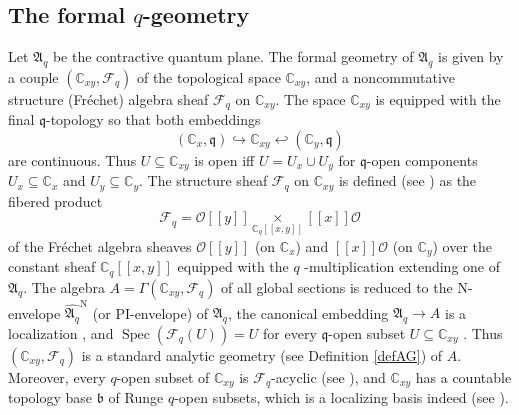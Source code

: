 \documentclass[12pt]{amsart}%
\theoremstyle{plain}
\numberwithin{equation}{section}
\numberwithin{equation}{section}
\numberwithin{theorem}{section}
\numberwithin{lemma}{section}
\numberwithin{remark}{section}
\numberwithin{example}{section}
\numberwithin{proposition}{section}
\numberwithin{definition}{section}
\numberwithin{corollary}{section}
\begin{document}
\subsection{The formal $q$-geometry}

Let $\mathfrak{A}_{q}$ be the contractive quantum plane. The formal geometry
of $\mathfrak{A}_{q}$ \cite{Dosi25} is given by a couple $\left(
\mathbb{C}_{xy},\mathcal{F}_{q}\right)  $ of the topological space
$\mathbb{C}_{xy}$, and a noncommutative structure (Fr\'{e}chet) algebra sheaf
$\mathcal{F}_{q}$ on $\mathbb{C}_{xy}$. The space $\mathbb{C}_{xy}$ is
equipped with the final $\mathfrak{q}$-topology so that both embeddings%
\[
\left(  \mathbb{C}_{x},\mathfrak{q}\right)  \hookrightarrow\mathbb{C}%
_{xy}\hookleftarrow\left(  \mathbb{C}_{y},\mathfrak{q}\right)
\]
are continuous. Thus $U\subseteq\mathbb{C}_{xy}$ is open iff $U=U_{x}\cup
U_{y}$ for $\mathfrak{q}$-open components $U_{x}\subseteq\mathbb{C}_{x}$ and
$U_{y}\subseteq\mathbb{C}_{y}$. The structure sheaf $\mathcal{F}_{q}$ on
$\mathbb{C}_{xy}$ is defined (see \cite{Dosi25}) as the fibered product
\[
\mathcal{F}_{q}=\mathcal{O}\left[  \left[  y\right]  \right]
\underset{\mathbb{C}_{q}\left[  \left[  x,y\right]  \right]  }{\times}\left[
\left[  x\right]  \right]  \mathcal{O}%
\]
of the Fr\'{e}chet algebra sheaves $\mathcal{O}\left[  \left[  y\right]
\right]  $ (on $\mathbb{C}_{x}$) and $\left[  \left[  x\right]  \right]
\mathcal{O}$ (on $\mathbb{C}_{y}$) over the constant sheaf $\mathbb{C}%
_{q}\left[  \left[  x,y\right]  \right]  $ equipped with the $q$%
-multiplication extending one of $\mathfrak{A}_{q}$. The algebra
$A=\Gamma\left(  \mathbb{C}_{xy},\mathcal{F}_{q}\right)  $ of all global
sections is reduced to the N-envelope $\widehat{\mathfrak{A}_{q}}^{\text{N}}$
(or PI-envelope) of $\mathfrak{A}_{q}$, the canonical embedding $\mathfrak{A}%
_{q}\rightarrow A$ is a localization \cite{DosiLoc}, and $\operatorname{Spec}%
\left(  \mathcal{F}_{q}\left(  U\right)  \right)  =U$ for every $\mathfrak{q}%
$-open subset $U\subseteq\mathbb{C}_{xy}$ \cite{DosiSS}. Thus $\left(
\mathbb{C}_{xy},\mathcal{F}_{q}\right)  $ is a standard analytic geometry (see
Definition \ref{defAG}) of $A$. Moreover, every $q$-open subset of
$\mathbb{C}_{xy}$ is $\mathcal{F}_{q}$-acyclic (see \cite{DosiSS}), and
$\mathbb{C}_{xy}$ has a countable topology base $\mathfrak{b}$ of Runge
$q$-open subsets, which is a localizing basis indeed (see \cite{DosiLoc}).
\end{document}
